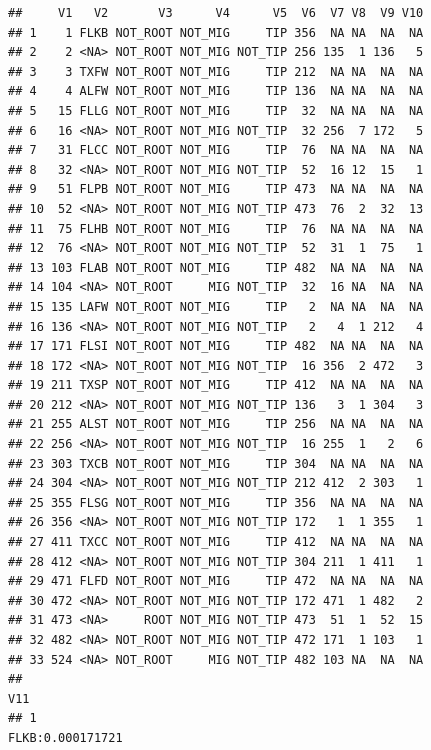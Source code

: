 \documentclass[]{article}
\begin{document}
\begin{verbatim}
##     V1   V2       V3      V4      V5  V6  V7 V8  V9 V10
## 1    1 FLKB NOT_ROOT NOT_MIG     TIP 356  NA NA  NA  NA
## 2    2 <NA> NOT_ROOT NOT_MIG NOT_TIP 256 135  1 136   5
## 3    3 TXFW NOT_ROOT NOT_MIG     TIP 212  NA NA  NA  NA
## 4    4 ALFW NOT_ROOT NOT_MIG     TIP 136  NA NA  NA  NA
## 5   15 FLLG NOT_ROOT NOT_MIG     TIP  32  NA NA  NA  NA
## 6   16 <NA> NOT_ROOT NOT_MIG NOT_TIP  32 256  7 172   5
## 7   31 FLCC NOT_ROOT NOT_MIG     TIP  76  NA NA  NA  NA
## 8   32 <NA> NOT_ROOT NOT_MIG NOT_TIP  52  16 12  15   1
## 9   51 FLPB NOT_ROOT NOT_MIG     TIP 473  NA NA  NA  NA
## 10  52 <NA> NOT_ROOT NOT_MIG NOT_TIP 473  76  2  32  13
## 11  75 FLHB NOT_ROOT NOT_MIG     TIP  76  NA NA  NA  NA
## 12  76 <NA> NOT_ROOT NOT_MIG NOT_TIP  52  31  1  75   1
## 13 103 FLAB NOT_ROOT NOT_MIG     TIP 482  NA NA  NA  NA
## 14 104 <NA> NOT_ROOT     MIG NOT_TIP  32  16 NA  NA  NA
## 15 135 LAFW NOT_ROOT NOT_MIG     TIP   2  NA NA  NA  NA
## 16 136 <NA> NOT_ROOT NOT_MIG NOT_TIP   2   4  1 212   4
## 17 171 FLSI NOT_ROOT NOT_MIG     TIP 482  NA NA  NA  NA
## 18 172 <NA> NOT_ROOT NOT_MIG NOT_TIP  16 356  2 472   3
## 19 211 TXSP NOT_ROOT NOT_MIG     TIP 412  NA NA  NA  NA
## 20 212 <NA> NOT_ROOT NOT_MIG NOT_TIP 136   3  1 304   3
## 21 255 ALST NOT_ROOT NOT_MIG     TIP 256  NA NA  NA  NA
## 22 256 <NA> NOT_ROOT NOT_MIG NOT_TIP  16 255  1   2   6
## 23 303 TXCB NOT_ROOT NOT_MIG     TIP 304  NA NA  NA  NA
## 24 304 <NA> NOT_ROOT NOT_MIG NOT_TIP 212 412  2 303   1
## 25 355 FLSG NOT_ROOT NOT_MIG     TIP 356  NA NA  NA  NA
## 26 356 <NA> NOT_ROOT NOT_MIG NOT_TIP 172   1  1 355   1
## 27 411 TXCC NOT_ROOT NOT_MIG     TIP 412  NA NA  NA  NA
## 28 412 <NA> NOT_ROOT NOT_MIG NOT_TIP 304 211  1 411   1
## 29 471 FLFD NOT_ROOT NOT_MIG     TIP 472  NA NA  NA  NA
## 30 472 <NA> NOT_ROOT NOT_MIG NOT_TIP 172 471  1 482   2
## 31 473 <NA>     ROOT NOT_MIG NOT_TIP 473  51  1  52  15
## 32 482 <NA> NOT_ROOT NOT_MIG NOT_TIP 472 171  1 103   1
## 33 524 <NA> NOT_ROOT     MIG NOT_TIP 482 103 NA  NA  NA
##                                                                                                                                                                                                                                                                                                                                                                                                                  V11
## 1                                                                                                                                                                                                                                                                                                                                                                                                   FLKB:0.000171721

\end{verbatim}
\end{document}
